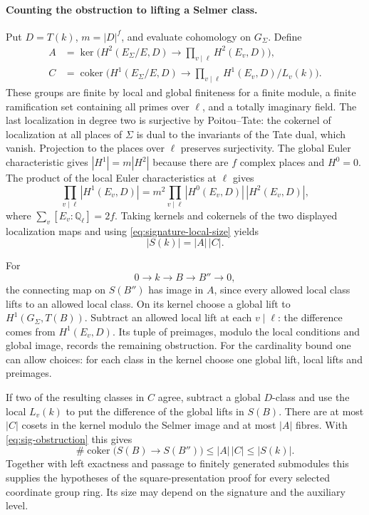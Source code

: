 \paragraph{Counting the obstruction to lifting a Selmer class.}
Put \(D=T(k)\), \(m=|D|^f\), and evaluate cohomology on
\(G_\Sigma\). Define
\[
 \begin{aligned}
 A&=\ker\Big(H^2(E_\Sigma/E,D)\longrightarrow
                   \prod_{v\mid\ell} H^2(E_v,D)\Big),\\
 C&=\operatorname{coker}\Big(H^1(E_\Sigma/E,D)
       \longrightarrow\prod_{v\mid\ell} H^1(E_v,D)/L_v(k)\Big).
 \end{aligned}
\]
These groups are finite by local and global finiteness for a
finite module, a finite ramification set containing all primes
over \(\ell\), and a totally imaginary field. The last
localization in degree two is surjective by Poitou--Tate:
the cokernel of localization at all places of \(\Sigma\)
is dual to the invariants of the Tate dual, which vanish.
Projection to the places over \(\ell\) preserves surjectivity.
The global Euler characteristic gives \(|H^1|=m|H^2|\)
because there are \(f\) complex places and \(H^0=0\).
The product of the local Euler characteristics at \(\ell\)
gives
\[
 \prod_{v\mid\ell}|H^1(E_v,D)|=
 m^2\prod_{v\mid\ell}|H^0(E_v,D)|\,|H^2(E_v,D)| ,
\]
where \(\sum_v[E_v:\mathbb Q_\ell]=2f\). Taking kernels
and cokernels of the two displayed localization maps and using
\eqref{eq:signature-local-size} yields \cite{milne-duality}
\begin{equation}\label{eq:sig-obstruction}
                        |S(k)|=|A|\,|C|.
\end{equation}

For
\[
 0\to k\to B\to B''\to0,
\]
the connecting map on
\(S(B'')\) has image in \(A\), since every allowed local class
lifts to an allowed local class. On its kernel choose a global
lift to \(H^1(G_\Sigma,T(B))\). Subtract an allowed local
lift at each \(v\mid\ell\): the difference comes from
\(H^1(E_v,D)\). Its tuple of preimages, modulo the local
conditions and global image, records the remaining obstruction.
For the cardinality bound one can allow choices: for each
class in the kernel choose one global lift, local lifts and
preimages.

If two of the resulting classes in \(C\) agree,
subtract a global \(D\)-class and use the local \(L_v(k)\)
to put the difference of the global lifts in \(S(B)\).
There are at most \(|C|\) cosets in the kernel modulo the Selmer image and at most \(|A|\) fibres. With \eqref{eq:sig-obstruction} this gives
\[
 \#\operatorname{coker}\bigl(S(B)\to S(B'')\bigr)\le |A|\,|C|\le |S(k)|.
\]
Together with left exactness and passage
to finitely generated submodules this supplies the hypotheses
of the square-presentation proof for every selected coordinate
group ring. Its size may depend on the signature and the
auxiliary level.
